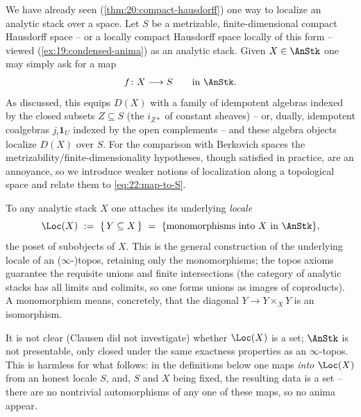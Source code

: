 We have already seen (\cref{thm:20:compact-hausdorff}) one way to localize an
analytic stack over a space. Let $S$ be a metrizable, finite-dimensional
compact Hausdorff space -- or a locally compact Hausdorff space locally of
this form -- viewed (\cref{ex:19:condensed-anima}) as an analytic stack. Given
$X\in\AnStk$ one may simply ask for a map
\begin{equation}
\label{eq:22:map-to-S}
f\colon X\longrightarrow S \qquad\text{in }\AnStk .
\end{equation}
As discussed, this equips $D(X)$ with a family of idempotent algebras indexed by
the closed subsets $Z\subseteq S$ (the $i_{Z*}$ of constant sheaves) -- or,
dually, idempotent coalgebras $j_!\mathbf 1_U$ indexed by the open complements
-- and these algebra objects localize $D(X)$ over $S$. For the comparison with
Berkovich spaces the metrizability/finite-dimensionality hypotheses, though
satisfied in practice, are an annoyance, so we introduce weaker notions of
localization along a topological space and relate them to
\eqref{eq:22:map-to-S}.

To any analytic stack $X$ one attaches its underlying \emph{locale}
\begin{equation*}
\Loc(X)\ :=\ \{\,Y\subseteq X\,\}\ =\ \{\text{monomorphisms into }X\text{ in
}\AnStk\},
\end{equation*}
the poset of subobjects of $X$. This is the general construction of the
underlying locale of an ($\infty$-)topos, retaining only the monomorphisms; the
topos axioms guarantee the requisite unions and finite intersections (the
category of analytic stacks has all limits and colimits, so one forms unions as
images of coproducts). A monomorphism means, concretely, that the diagonal
$Y\to Y\times_X Y$ is an isomorphism.

\begin{remark}
\label{rmk:22:size}
It is not clear (Clausen did not investigate) whether $\Loc(X)$ is a set;
$\AnStk$ is not presentable, only closed under the same exactness properties as
an $\infty$-topos. This is harmless for what follows: in the definitions below
one maps \emph{into} $\Loc(X)$ from an honest locale $S$, and, $S$ and $X$ being
fixed, the resulting data is a set -- there are no nontrivial automorphisms of
any one of these maps, so no anima appear.
\end{remark}

